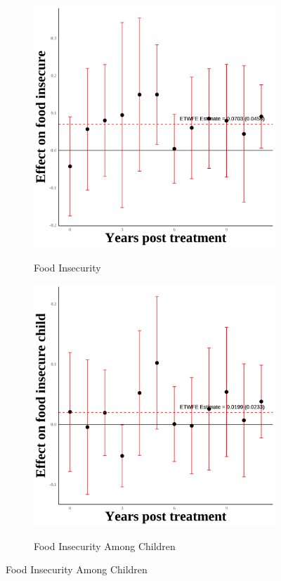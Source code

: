 \documentclass[12pt,english]{article}
\begin{document}
\begin{figure}[H]
  \begin{subfigure}[b]{0.3\textwidth}
    \centering
    \caption{Food Insecurity}
    \includegraphics[width=\linewidth]{figures/plot47-food_insecure_event_study-secgen-wh.png}
    \label{fig:food-insecure-secgen-wh}
  \end{subfigure}
  \hfill
  \begin{subfigure}[b]{0.3\textwidth}
    \centering
    \caption{Food Insecurity Among Children}
    \includegraphics[width=\linewidth]{figures/plot48-food_insecure_child_event_study-secgen-wh.png}
    \label{fig:food-insecure-child-secgen-wh}
  \end{subfigure}

\end{figure}
\end{document}
